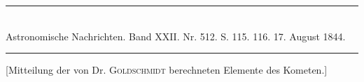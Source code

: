 \bigskip
\hypertarget{native-472-notice}{}
\begin{center}
\rule{0.55\linewidth}{0.4pt}\\[2pt]
Astronomische Nachrichten. Band XXII. Nr. 512. S. 115. 116. 17. August 1844.\\[2pt]
\rule{0.55\linewidth}{0.4pt}
\end{center}

[Mitteilung der von Dr. \textsc{Goldschmidt} berechneten Elemente des Kometen.]

